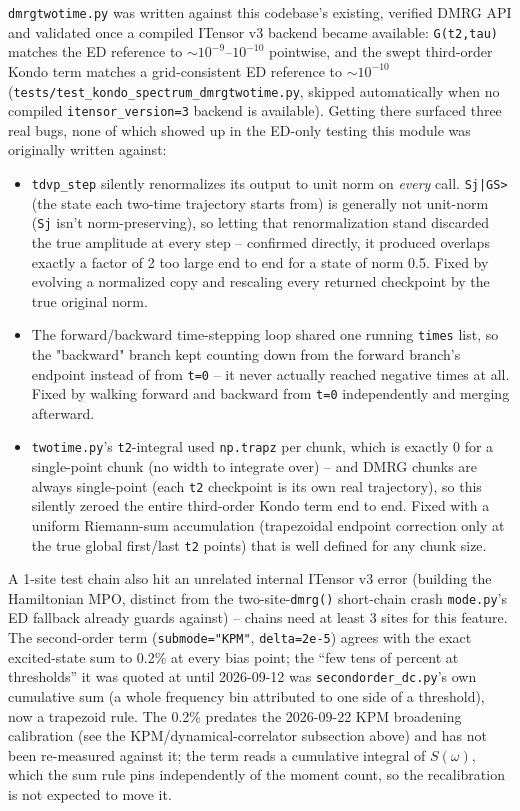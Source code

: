 \documentclass[11pt]{article}
\begin{document}
\texttt{dmrgtwotime.py} was written against this codebase's existing,
verified DMRG API and validated once a compiled ITensor v3 backend
became available: \texttt{G(t2,tau)} matches the ED reference to
$\sim10^{-9}$--$10^{-10}$ pointwise, and the swept third-order Kondo term
matches a grid-consistent ED reference to $\sim10^{-10}$
(\texttt{tests/test\_kondo\_spectrum\_dmrgtwotime.py}, skipped
automatically when no compiled \texttt{itensor\_version=3} backend is
available). Getting there surfaced three real bugs, none of which showed
up in the ED-only testing this module was originally written against:

\begin{itemize}
\item \texttt{tdvp\_step} silently renormalizes its output to unit norm
  on \emph{every} call. \texttt{Sj|GS>} (the state each two-time
  trajectory starts from) is generally not unit-norm (\texttt{Sj} isn't
  norm-preserving), so letting that renormalization stand discarded the
  true amplitude at every step -- confirmed directly, it produced
  overlaps exactly a factor of 2 too large end to end for a state of
  norm 0.5. Fixed by evolving a normalized copy and rescaling every
  returned checkpoint by the true original norm.
\item The forward/backward time-stepping loop shared one running
  \texttt{times} list, so the "backward" branch kept counting down from
  the forward branch's endpoint instead of from \texttt{t=0} -- it never
  actually reached negative times at all. Fixed by walking forward and
  backward from \texttt{t=0} independently and merging afterward.
\item \texttt{twotime.py}'s \texttt{t2}-integral used \texttt{np.trapz}
  per chunk, which is exactly 0 for a single-point chunk (no width to
  integrate over) -- and DMRG chunks are always single-point (each
  \texttt{t2} checkpoint is its own real trajectory), so this silently
  zeroed the entire third-order Kondo term end to end. Fixed with a
  uniform Riemann-sum accumulation (trapezoidal endpoint correction only
  at the true global first/last \texttt{t2} points) that is well defined
  for any chunk size.
\end{itemize}

A 1-site test chain also hit an unrelated internal ITensor v3 error
(building the Hamiltonian MPO, distinct from the two-site-\texttt{dmrg()}
short-chain crash \texttt{mode.py}'s ED fallback already guards against)
-- chains need at least 3 sites for this feature. The second-order term
(\texttt{submode="KPM"}, \texttt{delta=2e-5}) agrees with the exact
excited-state sum to 0.2\% at every bias point; the ``few tens of
percent at thresholds'' it was quoted at until 2026-09-12 was
\texttt{secondorder\_dc.py}'s own cumulative sum (a whole frequency bin
attributed to one side of a threshold), now a trapezoid rule. The 0.2\%
predates the 2026-09-22 KPM broadening calibration (see the
KPM/dynamical-correlator subsection above) and has not been re-measured
against it; the term reads a cumulative integral of $S(\omega)$, which
the sum rule pins independently of the moment count, so the
recalibration is not expected to move it.
\end{document}
